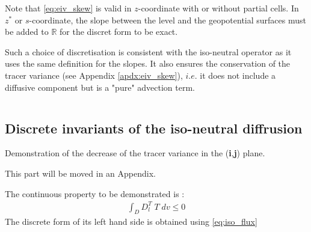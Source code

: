 \documentclass[../tex_main/NEMO_manual]{subfiles}
\begin{document}
Note that \autoref{eq:eiv_skew} is valid in $z$-coordinate with or without partial cells. 
In $z^*$ or $s$-coordinate, the slope between the level and the geopotential surfaces 
must be added to $\mathbb{R}$ for the discret form to be exact. 

Such a choice of discretisation is consistent with the iso-neutral operator as it uses the 
same definition for the slopes. It also ensures the conservation of the tracer variance 
(see Appendix \autoref{apdx:eiv_skew}), $i.e.$ it does not include a diffusive component 
but is a "pure" advection term.




$\ $\newpage      %
\subsection{Discrete invariants of the iso-neutral diffrusion}
\label{subsec:Gf_operator}

Demonstration of the decrease of the tracer variance in the (\textbf{i},\textbf{j}) plane. 

This part will be moved in an Appendix.

The continuous property to be demonstrated is :
\begin{align*}
\int_D  D_l^T \; T \;dv   \leq 0
\end{align*}
The discrete form of its left hand side is obtained using \autoref{eq:iso_flux}
\end{document}
